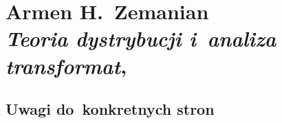 \documentclass[a4paper,11pt]{article}
\begin{document}
















\section{Armen H.~Zemanian \\
  \textit{Teoria dystrybucji i~analiza transformat},
  \cite{ZemanianTeoriaDystrybucjiETC1969}}



\subsection{Uwagi do~konkretnych stron}

\label{sec:Uwagi-do-konkrentych-stron}
\end{document}
